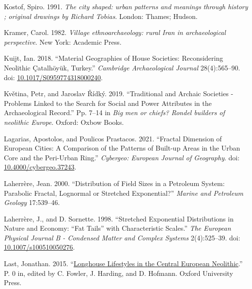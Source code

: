\documentclass[
  12pt,
]{book}
\newlength{\cslhangindent}
\newlength{\cslentryspacingunit} %
\newenvironment{CSLReferences}[2] %
 {%
  \setlength{\parindent}{0pt}
  \ifodd #1
  \let\oldpar\par
  \def\par{\hangindent=\cslhangindent\oldpar}
  \fi
  \setlength{\parskip}{#2\cslentryspacingunit}
 }%
 {}
\begin{document}
\begin{CSLReferences}{1}{0}
\leavevmode{}%
Kostof, Spiro. 1991. \emph{The city shaped: urban patterns and meanings through history ; original drawings by Richard Tobias}. London: Thames; Hudson.

\leavevmode{}%
Kramer, Carol. 1982. \emph{Village ethnoarchaeology: rural Iran in archaeological perspective}. New York: Academic Press.

\leavevmode{}%
Kuijt, Ian. 2018. {``Material Geographies of House Societies: Reconsidering Neolithic Çatalhöyük, Turkey.''} \emph{Cambridge Archaeological Journal} 28(4):565--90. doi: \href{https://doi.org/10.1017/S0959774318000240}{10.1017/S0959774318000240}.

\leavevmode{}%
Květina, Petr, and Jaroslav Řídký. 2019. {``Traditional and Archaic Societies - Problems Linked to the Search for Social and Power Attributes in the Archaeological Record.''} Pp. 7--14 in \emph{Big men or chiefs? {Rondel} builders of neolithic {Europe}}. {Oxford}: {Oxbow Books}.

\leavevmode{}%
Lagarias, Apostolos, and Poulicos Prastacos. 2021. {``Fractal Dimension of European Cities: A Comparison of the Patterns of Built-up Areas in the Urban Core and the Peri-Urban Ring.''} \emph{Cybergeo: European Journal of Geography}. doi: \href{https://doi.org/10.4000/cybergeo.37243}{10.4000/cybergeo.37243}.

\leavevmode{}%
Laherrère, Jean. 2000. {``Distribution of Field Sizes in a Petroleum System: Parabolic Fractal, Lognormal or Stretched Exponential?''} \emph{Marine and Petroleum Geology} 17:539--46.

\leavevmode{}%
Laherrère, J., and D. Sornette. 1998. {``Stretched Exponential Distributions in Nature and Economy: {``}Fat Tails{''} with Characteristic Scales.''} \emph{The European Physical Journal B - Condensed Matter and Complex Systems} 2(4):525--39. doi: \href{https://doi.org/10.1007/s100510050276}{10.1007/s100510050276}.

\leavevmode{}%
Last, Jonathan. 2015. {``\href{https://doi.org/10.1093/oxfordhb/9780199545841.013.009}{Longhouse Lifestyles in the Central European Neolithic}.''} P. 0 in, edited by C. Fowler, J. Harding, and D. Hofmann. Oxford University Press.


\end{CSLReferences}
\end{document}
